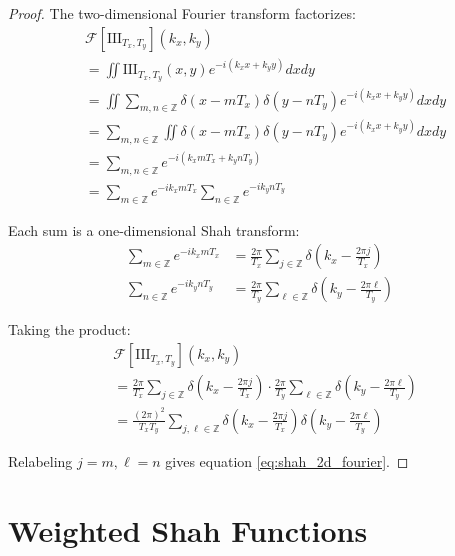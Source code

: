 \documentclass{article}
\begin{document}
\begin{proof}
The two-dimensional Fourier transform factorizes:
\begin{align}
&\mathcal{F}[\text{III}_{T_x,T_y}](k_x, k_y) \nonumber\\
&= \iint \text{III}_{T_x,T_y}(x,y) e^{-i(k_x x + k_y y)} dx dy \label{eq:2d_fourier_def}\\
&= \iint \sum_{m,n \in \mathbb{Z}} \delta(x - mT_x) \delta(y - nT_y) e^{-i(k_x x + k_y y)} dx dy \label{eq:substitute_2d_shah}\\
&= \sum_{m,n \in \mathbb{Z}} \iint \delta(x - mT_x) \delta(y - nT_y) e^{-i(k_x x + k_y y)} dx dy \label{eq:interchange_sum_integral}\\
&= \sum_{m,n \in \mathbb{Z}} e^{-i(k_x mT_x + k_y nT_y)} \label{eq:delta_sifting_2d}\\
&= \sum_{m \in \mathbb{Z}} e^{-i k_x mT_x} \sum_{n \in \mathbb{Z}} e^{-i k_y nT_y} \label{eq:factor_exponentials}
\end{align}

Each sum is a one-dimensional Shah transform:
\begin{align}
\sum_{m \in \mathbb{Z}} e^{-i k_x mT_x} &= \frac{2\pi}{T_x} \sum_{j \in \mathbb{Z}} \delta\left(k_x - \frac{2\pi j}{T_x}\right) \label{eq:x_direction_shah}\\
\sum_{n \in \mathbb{Z}} e^{-i k_y nT_y} &= \frac{2\pi}{T_y} \sum_{\ell \in \mathbb{Z}} \delta\left(k_y - \frac{2\pi \ell}{T_y}\right) \label{eq:y_direction_shah}
\end{align}

Taking the product:
\begin{align}
&\mathcal{F}[\text{III}_{T_x,T_y}](k_x, k_y) \nonumber\\
&= \frac{2\pi}{T_x} \sum_{j \in \mathbb{Z}} \delta\left(k_x - \frac{2\pi j}{T_x}\right) \cdot \frac{2\pi}{T_y} \sum_{\ell \in \mathbb{Z}} \delta\left(k_y - \frac{2\pi \ell}{T_y}\right) \label{eq:product_1d_transforms}\\
&= \frac{(2\pi)^2}{T_x T_y} \sum_{j,\ell \in \mathbb{Z}} \delta\left(k_x - \frac{2\pi j}{T_x}\right) \delta\left(k_y - \frac{2\pi \ell}{T_y}\right) \label{eq:final_2d_result}
\end{align}

Relabeling $j = m, \ell = n$ gives equation \eqref{eq:shah_2d_fourier}.
\end{proof}

\section{Weighted Shah Functions}
\end{document}
